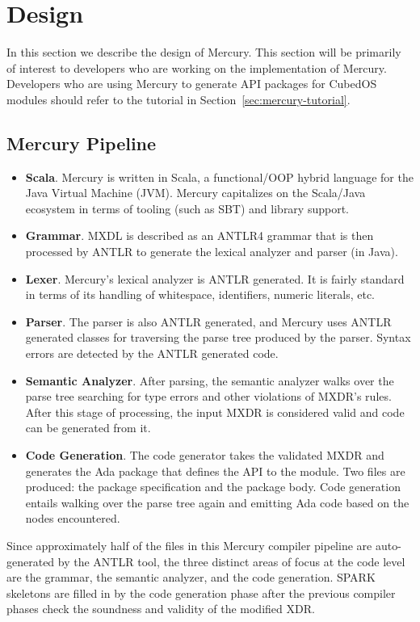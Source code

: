 \section{Design}
\label{sec:mercury-design}

In this section we describe the design of Mercury. This section will be primarily of interest to
developers who are working on the implementation of Mercury. Developers who are using Mercury to
generate API packages for CubedOS modules should refer to the tutorial in
Section~\ref{sec:mercury-tutorial}.

\subsection{Mercury Pipeline}

\begin{itemize}
\item \textbf{Scala}. Mercury is written in Scala, a functional/OOP hybrid language for the Java
Virtual Machine (JVM). Mercury capitalizes on the Scala/Java ecosystem in terms of tooling (such
as SBT) and library support.

\item \textbf{Grammar}. MXDL is described as an ANTLR4 grammar that is then processed by ANTLR
to generate the lexical analyzer and parser (in Java).

\item \textbf{Lexer}. Mercury's lexical analyzer is ANTLR generated. It is fairly standard in
terms of its handling of whitespace, identifiers, numeric literals, etc.

\item \textbf{Parser}. The parser is also ANTLR generated, and Mercury uses ANTLR generated
classes for traversing the parse tree produced by the parser. Syntax errors are detected by the
ANTLR generated code.

\item \textbf{Semantic Analyzer}. After parsing, the semantic analyzer walks over the parse tree
searching for type errors and other violations of MXDR's rules. After this stage of processing,
the input MXDR is considered valid and code can be generated from it.

\item \textbf{Code Generation}. The code generator takes the validated MXDR and generates the
Ada package that defines the API to the module. Two files are produced: the package
specification and the package body. Code generation entails walking over the parse tree again
and emitting Ada code based on the nodes encountered.
\end{itemize}

Since approximately half of the files in this Mercury compiler pipeline are auto-generated by
the ANTLR tool, the three distinct areas of focus at the code level are the grammar, the
semantic analyzer, and the code generation. SPARK skeletons are filled in by the code generation
phase after the previous compiler phases check the soundness and validity of the modified XDR.
